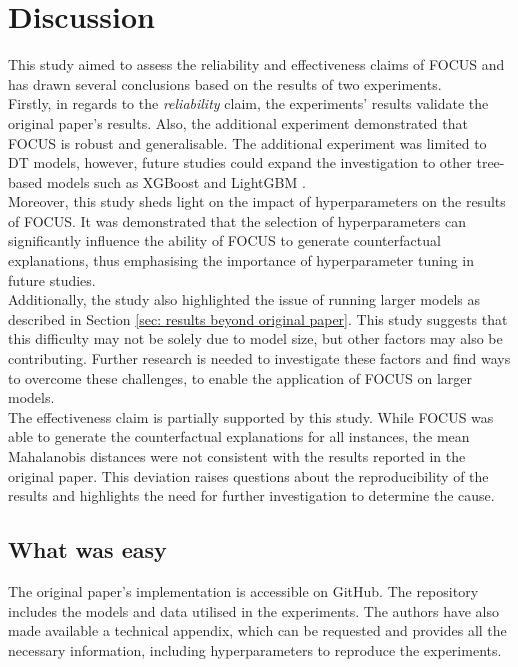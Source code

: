 \section{Discussion}
This study aimed to assess the reliability and effectiveness claims of FOCUS and has drawn several conclusions based on the results of two experiments.\\
Firstly, in regards to the \textit{reliability} claim, the experiments' results validate the original paper's results. Also, the additional experiment demonstrated that FOCUS is robust and generalisable. The additional experiment was limited to DT models, however, future studies could expand the investigation to other tree-based models such as XGBoost \cite{Chen:2016:XST:2939672.2939785} and LightGBM \cite{ke2017lightgbm}.\\
Moreover, this study sheds light on the impact of hyperparameters on the results of FOCUS. It was demonstrated that the selection of hyperparameters can significantly influence the ability of FOCUS to generate counterfactual explanations, thus emphasising the importance of hyperparameter tuning in future studies.\\
Additionally, the study also highlighted the issue of running larger models as described in Section \ref{sec: results beyond original paper}. This study suggests that this difficulty may not be solely due to model size, but other factors may also be contributing. Further research is needed to investigate these factors and find ways to overcome these challenges, to enable the application of FOCUS on larger models.\\
The effectiveness claim is partially supported by this study. While FOCUS was able to generate the counterfactual explanations for all instances, the mean Mahalanobis distances were not consistent with the results reported in the original paper. This deviation raises questions about the reproducibility of the results and highlights the need for further investigation to determine the cause.


\subsection{What was easy}
The original paper's implementation is accessible on GitHub. The repository includes the models and data utilised in the experiments. The authors have also made available a technical appendix, which can be requested and provides all the necessary information, including hyperparameters to reproduce the experiments.

